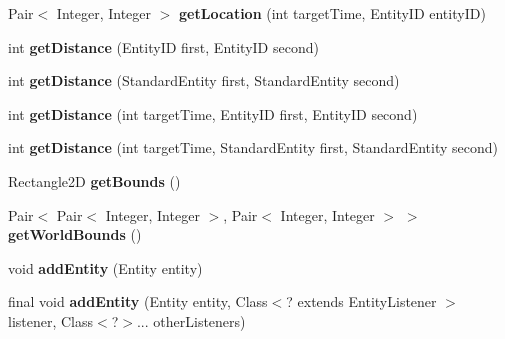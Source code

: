 \begin{DoxyCompactItemize}
Pair$<$ Integer, Integer $>$ {\bfseries get\+Location} (int target\+Time, Entity\+ID entity\+ID)
\item 
\hypertarget{classadf_1_1agent_1_1info_1_1WorldInfo_aa166113a0e088017dadd384bfaa1deb4}{}\label{classadf_1_1agent_1_1info_1_1WorldInfo_aa166113a0e088017dadd384bfaa1deb4} 
int {\bfseries get\+Distance} (Entity\+ID first, Entity\+ID second)
\item 
\hypertarget{classadf_1_1agent_1_1info_1_1WorldInfo_ab3c48e51677e253ea250bb46e3187161}{}\label{classadf_1_1agent_1_1info_1_1WorldInfo_ab3c48e51677e253ea250bb46e3187161} 
int {\bfseries get\+Distance} (Standard\+Entity first, Standard\+Entity second)
\item 
\hypertarget{classadf_1_1agent_1_1info_1_1WorldInfo_a7644341504d7b47fba43ac9396c23361}{}\label{classadf_1_1agent_1_1info_1_1WorldInfo_a7644341504d7b47fba43ac9396c23361} 
int {\bfseries get\+Distance} (int target\+Time, Entity\+ID first, Entity\+ID second)
\item 
\hypertarget{classadf_1_1agent_1_1info_1_1WorldInfo_aacc46d81b020567bd045aa8ad57007f2}{}\label{classadf_1_1agent_1_1info_1_1WorldInfo_aacc46d81b020567bd045aa8ad57007f2} 
int {\bfseries get\+Distance} (int target\+Time, Standard\+Entity first, Standard\+Entity second)
\item 
\hypertarget{classadf_1_1agent_1_1info_1_1WorldInfo_a3581114bab360a7629a743fc57261314}{}\label{classadf_1_1agent_1_1info_1_1WorldInfo_a3581114bab360a7629a743fc57261314} 
Rectangle2D {\bfseries get\+Bounds} ()
\item 
\hypertarget{classadf_1_1agent_1_1info_1_1WorldInfo_aa1281c36005e416c0012c2b7b1320e69}{}\label{classadf_1_1agent_1_1info_1_1WorldInfo_aa1281c36005e416c0012c2b7b1320e69} 
Pair$<$ Pair$<$ Integer, Integer $>$, Pair$<$ Integer, Integer $>$ $>$ {\bfseries get\+World\+Bounds} ()
\item 
\hypertarget{classadf_1_1agent_1_1info_1_1WorldInfo_aec5d825367631b7e8afd961f46b819d2}{}\label{classadf_1_1agent_1_1info_1_1WorldInfo_aec5d825367631b7e8afd961f46b819d2} 
void {\bfseries add\+Entity} (Entity entity)
\item 
\hypertarget{classadf_1_1agent_1_1info_1_1WorldInfo_a0cecdeeb393dad5db0ed4bb9f52271bc}{}\label{classadf_1_1agent_1_1info_1_1WorldInfo_a0cecdeeb393dad5db0ed4bb9f52271bc} 
final void {\bfseries add\+Entity} (Entity entity, Class$<$? extends Entity\+Listener $>$ listener, Class$<$?$>$... other\+Listeners)
\item 
\hypertarget{classadf_1_1agent_1_1info_1_1WorldInfo_a5a256a579fd549f10ba4417501533709}{}\label{classadf_1_1agent_1_1info_1_1WorldInfo_a5a256a579fd549f10ba4417501533709} 

\end{DoxyCompactItemize}
